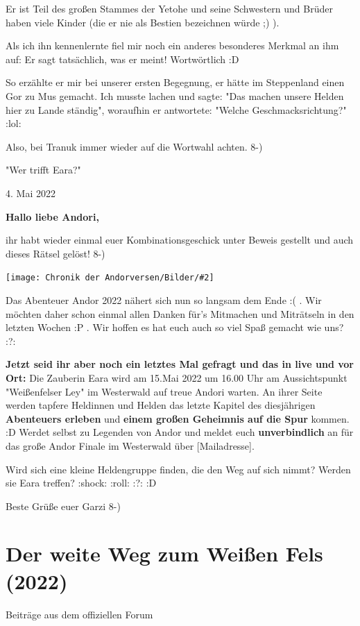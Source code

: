 \documentclass[10pt, a4paper, oneside]{book}
\newcommand{\fillbreak}{\vspace*{\fill}\columnbreak}
\newcommand{\storytext}[1]{%
    \section{#1}%
    \label{Storytext: #1}%
}
\newcommand{\bildmitts}[2][height=0.32\textwidth,width=0.48\textwidth,keepaspectratio]{%
    \begin{center}
        \texttt{[image: Chronik der Andorversen/Bilder/\#2]}
    \end{center}
}
\begin{document}
\begin{multicols}{2}
Er ist Teil des großen Stammes der Yetohe und seine Schwestern und Brüder haben viele Kinder (die er nie als Bestien bezeichnen würde ;) ).

Als ich ihn kennenlernte fiel mir noch ein anderes besonderes Merkmal an ihm auf: Er sagt tatsächlich, was er meint! Wortwörtlich :D

So erzählte er mir bei unserer ersten Begegnung, er hätte im Steppenland einen Gor zu Mus gemacht. Ich musste lachen und sagte: "Das machen unsere Helden hier zu Lande ständig", woraufhin er antwortete: "Welche Geschmacksrichtung?" :lol:

Also, bei Tranuk immer wieder auf die Wortwahl achten. 8-)




\begin{center}
    "Wer trifft Eara?"

    4. Mai 2022
\end{center}

\textbf{Hallo liebe Andori,}

ihr habt wieder einmal euer Kombinationsgeschick unter Beweis gestellt und auch dieses Rätsel gelöst! 8-)

\bildmitts{AA2022 Wer trifft Eara.jpeg}

Das Abenteuer Andor 2022 nähert sich nun so langsam dem Ende :( . Wir möchten daher schon einmal allen Danken für's Mitmachen und Miträtseln in den letzten Wochen :P . Wir hoffen es hat euch auch so viel Spaß gemacht wie uns? :?:

\textbf{Jetzt seid ihr aber noch ein letztes Mal gefragt und das in live und vor Ort:}
Die Zauberin Eara wird am 15.Mai 2022 um 16.00 Uhr am Aussichtspunkt "Weißenfelser Ley" im Westerwald auf treue Andori warten. An ihrer Seite werden tapfere Heldinnen und Helden das letzte Kapitel des diesjährigen \textbf{Abenteuers erleben} und \textbf{einem großen Geheimnis auf die Spur} kommen. :D
Werdet selbst zu Legenden von Andor und meldet euch \textbf{unverbindlich} an für das große Andor Finale im Westerwald über [Mailadresse].

Wird sich eine kleine Heldengruppe finden, die den Weg auf sich nimmt? Werden sie Eara treffen? :shock: :roll: :?: :D


Beste Grüße
euer Garzi 8-)



\fillbreak
\storytext{Der weite Weg zum Weißen Fels (2022)}


\begin{center}
    Beiträge aus dem offiziellen Forum


\end{center}
\end{multicols}
\end{document}
